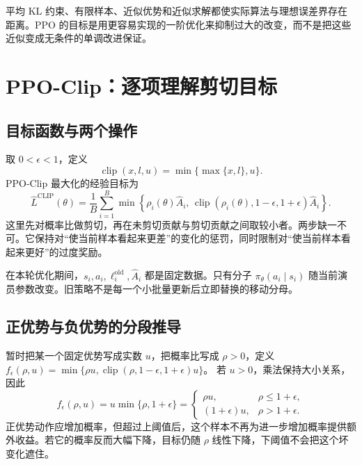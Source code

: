 \documentclass[UTF8]{ctexart}
\begin{document}
平均 KL 约束、有限样本、近似优势和近似求解都使实际算法与理想误差界存在距离。PPO 的目标是用更容易实现的一阶优化来抑制过大的改变，而不是把这些近似变成无条件的单调改进保证。

\section{PPO-Clip：逐项理解剪切目标}
\label{sec:ppo-clipping}

\subsection{目标函数与两个操作}

取 $0<\epsilon<1$，定义
\[
  \operatorname{clip}(x,l,u)=\min\{\max\{x,l\},u\}.
\]
PPO-Clip 最大化的经验目标为\cite{schulman-ppo}
\begin{equation}
  \widehat L^{\mathrm{CLIP}}(\theta)
  =\frac1B\sum_{i=1}^B
    \min\!\left\{
      \rho_i(\theta)\widehat A_i,\,
      \operatorname{clip}(\rho_i(\theta),1-\epsilon,1+\epsilon)
      \widehat A_i
    \right\}.
  \label{eq:ppo-clip-objective}
\end{equation}
这里先对概率比做剪切，再在未剪切贡献与剪切贡献之间取较小者。两步缺一不可。它保持对“使当前样本看起来更差”的变化的惩罚，同时限制对“使当前样本看起来更好”的过度奖励。

在本轮优化期间，$s_i,a_i,\ell_i^{\mathrm{old}},\widehat A_i$ 都是固定数据。只有分子 $\pi_\theta(a_i\mid s_i)$ 随当前演员参数改变。旧策略不是每一个小批量更新后立即替换的移动分母。

\subsection{正优势与负优势的分段推导}

暂时把某一个固定优势写成实数 $u$，把概率比写成 $\rho>0$，定义
$f_\epsilon(\rho,u)=
\min\{\rho u,\operatorname{clip}(\rho,1-\epsilon,1+\epsilon)u\}$。
若 $u>0$，乘法保持大小关系，因此
\begin{equation}
  f_\epsilon(\rho,u)
  =u\min\{\rho,1+\epsilon\}
  =
  \begin{cases}
    \rho u,&\rho\le1+\epsilon,\\
    (1+\epsilon)u,&\rho>1+\epsilon.
  \end{cases}
  \label{eq:ppo-positive-clip}
\end{equation}
正优势动作应增加概率，但超过上阈值后，这个样本不再为进一步增加概率提供额外收益。若它的概率反而大幅下降，目标仍随 $\rho$ 线性下降，下阈值不会把这个坏变化遮住。
\end{document}
